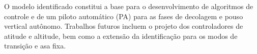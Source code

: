 \documentclass[letterpaper, 10 pt, conference]{ieeeconf}
\begin{document}
O modelo identificado constitui a base para o desenvolvimento de algoritmos de controle e de um piloto automático (PA) para as fases de decolagem e pouso vertical autônomo. Trabalhos futuros incluem o projeto dos controladores de atitude e altitude, bem como a extensão da identificação para os modos de transição e asa fixa.

\addtolength{\textheight}{-12cm}   %








\end{document}
